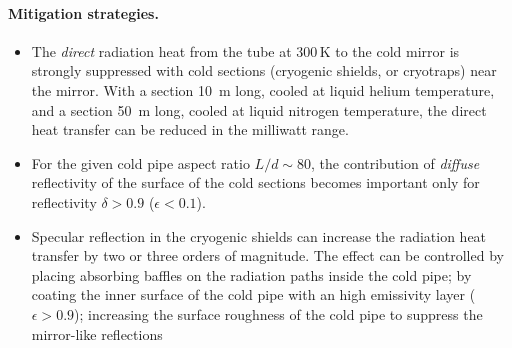
\paragraph{Mitigation strategies.\newline}
\begin{itemize}
\item{The \emph{direct} radiation heat from the tube at 300\,K to the cold mirror is strongly suppressed with cold sections (cryogenic shields, or cryotraps) near the mirror. With a section 10\, m long, cooled at liquid helium temperature, and a section 50\, m long, cooled at liquid nitrogen temperature, the direct heat transfer can be reduced in the milliwatt range.}
\item{For the given cold pipe aspect ratio $L/d \sim 80$, the contribution of \emph{diffuse} reflectivity of the surface of the cold sections becomes important only for reflectivity $\delta > 0.9$ ($\epsilon < 0.1$).}
\item{Specular reflection in the cryogenic shields can increase the radiation heat transfer by two or three orders of magnitude. The effect can be controlled by placing absorbing baffles on the radiation paths inside the cold pipe; by coating the inner surface of the cold pipe with an high emissivity layer ($\epsilon > 0.9$); increasing the surface roughness of the cold pipe to suppress the mirror-like reflections} 
\end{itemize}
